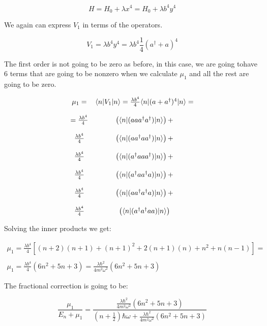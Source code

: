 \begin{equation}
  H = H_0 + \lambda x^4 = H_0 + \lambda b^4 y^4
\end{equation}

We again can express $V_1$ in terms of the operators.

\begin{equation}
  V_1 = \lambda b^4 y^4 = \lambda b^4 \frac{1}{4} (a^\dagger + a)^4
\end{equation}

The first order is not going to be zero as before, in this case, we are going tohave 6 terms that are going to be nonzero when we calculate $\mu_1$ and all the rest are going to be zero.

\begin{equation}
  \begin{array}{cc}
    \mu_1 = & \langle n\rvert V_1\lvert n\rangle = \frac{\lambda b^4}{4} \langle n\rvert(a+a^\dagger)^4\lvert n\rangle =
    \\

    \\
    = \frac{\lambda b^4}{4} & \left(\langle n\rvert(a a a^\dagger a^\dagger)\lvert n\rangle\right) +
    \\

    \\
      \frac{\lambda b^4}{4}  & \left(\langle n\rvert(a a^\dagger a a^\dagger)\lvert n\rangle\right) +
    \\

    \\
    \frac{\lambda b^4}{4}& \left(\langle n\rvert(a^\dagger a a a^\dagger)\lvert n\rangle\right) +
    \\

    \\
    \frac{\lambda b^4}{4}           & \left(\langle n\rvert(a^\dagger a a^\dagger a)\lvert n\rangle\right) +
    \\

    \\
    \frac{\lambda b^4}{4}       & \left(\langle n\rvert(a a^\dagger a^\dagger a)\lvert n\rangle\right) +
    \\

    \\
    \frac{\lambda b^4}{4}      & \left(\langle n\rvert(a^\dagger a^\dagger a a)\lvert n\rangle\right)
  \end{array}
\end{equation}

Solving the inner products we get:

\begin{equation}
  \begin{array}{c}
    \mu_1 = \frac{\lambda b^4}{4} \left[(n+2)(n+1)+(n+1)^2+2(n+1)(n)+n^2+n(n-1)\right] =
    \\

    \\
    \mu_1 = \frac{\lambda b^4}{4} (6n^2+5n+3) = \frac{\lambda \hbar^2}{4 m^2\omega^2} (6n^2+5n+3)
  \end{array}
\end{equation}

The fractional correction is going to be:

\begin{equation}
  \frac{\mu_1}{E_n+\mu_1} = \frac{\frac{\lambda \hbar^2}{4 m^2\omega^2} (6n^2+5n+3)}{\left(n+\frac{1}{2}\right)\hbar \omega + \frac{\lambda \hbar^2}{4 m^2\omega^2} (6n^2+5n+3)}
\end{equation}
